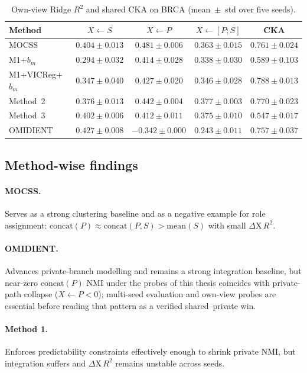 \begin{table}[htbp]
\centering
\caption{Own-view Ridge $R^{2}$ and shared CKA on BRCA (mean~$\pm$~std over five seeds).}
\label{tab:ownview}
\begin{tabular}{lcccc}
\hline
Method & $X\leftarrow S$ & $X\leftarrow P$ & $X\leftarrow[P;S]$ & CKA \\
\hline
MOCSS & $0.404\pm0.013$ & $0.481\pm0.006$ & $0.363\pm0.015$ & $0.761\pm0.024$ \\
M1+$b_m$ & $0.294\pm0.032$ & $0.414\pm0.028$ & $0.338\pm0.030$ & $0.589\pm0.103$ \\
M1+VICReg+$b_m$ & $0.347\pm0.040$ & $0.427\pm0.020$ & $0.346\pm0.028$ & $0.788\pm0.013$ \\
Method~2 & $0.376\pm0.013$ & $0.442\pm0.004$ & $0.377\pm0.003$ & $0.770\pm0.023$ \\
Method~3 & $0.402\pm0.006$ & $0.412\pm0.011$ & $0.375\pm0.010$ & $0.547\pm0.017$ \\
OMIDIENT & $0.427\pm0.008$ & $-0.342\pm0.000$ & $0.243\pm0.011$ & $0.757\pm0.037$ \\
\hline
\end{tabular}
\end{table}

\subsection{Method-wise findings}

\paragraph{MOCSS.}
Serves as a strong clustering baseline and as a negative example for role assignment: $\mathrm{concat}(P)\approx\mathrm{concat}(P,S)>\mathrm{mean}(S)$ with small $\Delta\mathrm{X}\,R^{2}$.

\paragraph{OMIDIENT.}
Advances private-branch modelling and remains a strong integration baseline, but near-zero $\mathrm{concat}(P)$ NMI under the probes of this thesis coincides with private-path collapse ($X\leftarrow P<0$); multi-seed evaluation and own-view probes are essential before reading that pattern as a verified shared--private win.

\paragraph{Method 1.}
Enforces predictability constraints effectively enough to shrink private NMI, but integration suffers and $\Delta\mathrm{X}\,R^{2}$ remains unstable across seeds.

